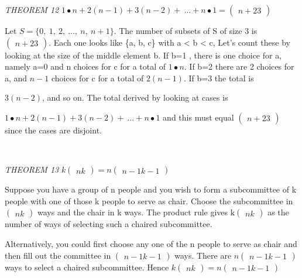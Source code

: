\documentclass[10pt,letter]{article}
\begin{document}
\emph{THEOREM 12}
\(1 \bullet n + 2\left( n - 1 \right) + 3\left( n - 2 \right) + \ \ldots + n \bullet 1 =
\begin{pmatrix}
n + 2
3
\end{pmatrix}
\)

Let \(S = \{ 0,\ 1,\ 2,\ \ldots,\ n,\ n + 1\}\). The number of subsets
of S of size 3 is \(\begin{pmatrix}
n + 2
3
\end{pmatrix}
\). Each one looks like \{a, b, c\} with a \textless{} b
\textless{} c, Let's count these by looking at the size of the middle
element b. If b=1 , there is one choice for a, namely a=0 and n choices
for c for a total of \(1 \bullet n\). If b=2 there are 2 choices for a,
and \(n - 1\) choices for c for a total of \(2(n - 1)\). If b=3 the
total is

\(3(n - 2)\), and so on. The total derived by looking at cases is

\(1 \bullet n + 2\left( n - 1 \right) + 3\left( n - 2 \right) + \ \ldots + n \bullet 1\)
and this must equal \(\begin{pmatrix}
n + 2
3
\end{pmatrix}
\) since the cases are disjoint.

\emph{\\
}

\emph{THEOREM 13} \(k
\begin{pmatrix}
n
k
\end{pmatrix}
 = n
\begin{pmatrix}
n - 1
k - 1
\end{pmatrix}
\)

Suppose you have a group of n people and you wish to form a subcommittee
of k people with one of those k people to serve as chair. Choose the
subcommittee in \(\begin{pmatrix}
n
k
\end{pmatrix}
\) ways and the chair in k ways. The product rule
gives\(\text{\ k}
\begin{pmatrix}
n
k
\end{pmatrix}
\) as the number of ways of selecting such a chaired
subcommittee.

Alternatively, you could first choose any one of the n people to serve
as chair and then fill out the committee in \(\begin{pmatrix}
n - 1
k - 1
\end{pmatrix}
\) ways. There are \(n
\begin{pmatrix}
n - 1
k - 1
\end{pmatrix}
\) ways to select a chaired subcommittee. Hence
\(k
\begin{pmatrix}
n
k
\end{pmatrix}
 = n
\begin{pmatrix}
n - 1
k - 1
\end{pmatrix}
\)
\end{document}
